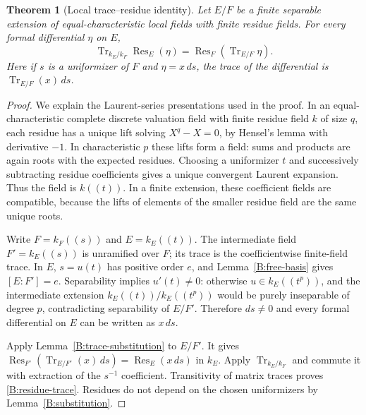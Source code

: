 \documentclass[11pt]{amsart}
\newtheorem{theorem}{Theorem}[section]
\theoremstyle{definition}
\theoremstyle{remark}
\newcommand{\Tr}{\operatorname{Tr}}
\newcommand{\Res}{\operatorname{Res}}
\begin{document}
\begin{theorem}[Local trace--residue identity]\label{B:trace-residue}
Let $E/F$ be a finite separable extension of equal-characteristic local
fields with finite residue fields. For every formal differential
$\eta$ on $E$,
\begin{equation}\label{B:residue-trace}
 \Tr_{k_E/k_F}\Res_E(\eta)=\Res_F(\Tr_{E/F}\eta).
\end{equation}
Here if $s$ is a uniformizer of $F$ and $\eta=x\,ds$, the trace of
the differential is $\Tr_{E/F}(x)\,ds$.
\end{theorem}
\begin{proof}
We explain the Laurent-series presentations used in the proof. In an
equal-characteristic complete discrete valuation field with finite
residue field $k$ of size $q$, each residue has a unique lift solving
$X^q-X=0$, by Hensel's lemma with derivative $-1$. In characteristic
$p$ these lifts form a field: sums and products are again roots with
the expected residues. Choosing a uniformizer $t$ and successively
subtracting residue coefficients gives a unique convergent Laurent
expansion. Thus the field is $k((t))$. In a finite extension, these
coefficient fields are compatible, because the lifts of elements of
the smaller residue field are the same unique roots.

Write $F=k_F((s))$ and $E=k_E((t))$. The intermediate field
$F'=k_E((s))$ is unramified over $F$; its trace is the coefficientwise
finite-field trace. In $E$, $s=u(t)$ has positive order $e$, and
Lemma~\ref{B:free-basis} gives $[E:F']=e$. Separability implies
$u'(t)\ne0$: otherwise $u\in k_E((t^p))$, and the intermediate
extension $k_E((t))/k_E((t^p))$ would be purely inseparable of degree
$p$, contradicting separability of $E/F'$. Therefore $ds\ne0$ and
every formal differential on $E$ can be written as $x\,ds$.

Apply Lemma~\ref{B:trace-substitution} to $E/F'$. It gives
$\Res_{F'}(\Tr_{E/F'}(x)\,ds)=\Res_E(x\,ds)$ in $k_E$.
Apply $\Tr_{k_E/k_F}$ and commute it with extraction of the
$s^{-1}$ coefficient. Transitivity of matrix traces proves
\eqref{B:residue-trace}. Residues do not depend on the chosen
uniformizers by Lemma~\ref{B:substitution}.
\end{proof}
\end{document}
